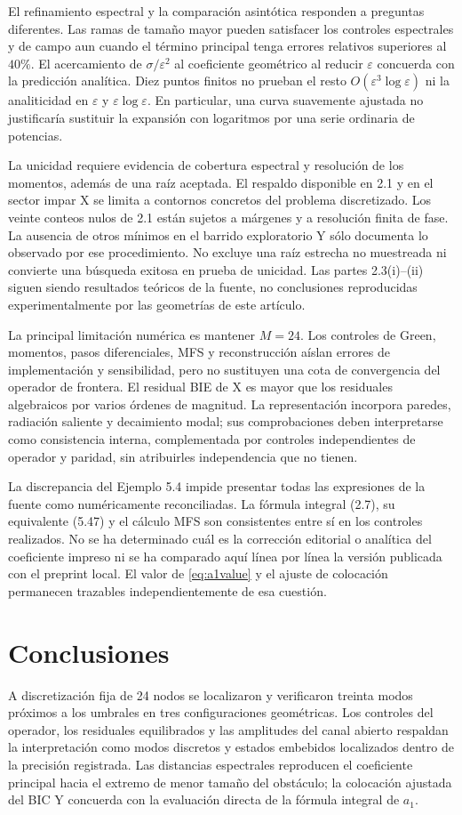 \documentclass[11pt]{article}
\newcommand{\eps}{\varepsilon}
\begin{document}
El refinamiento espectral y la comparación asintótica responden a preguntas diferentes. Las ramas de tamaño mayor pueden satisfacer los controles espectrales y de campo aun cuando el término principal tenga errores relativos superiores al $40\%$. El acercamiento de $\sigma/\eps^2$ al coeficiente geométrico al reducir $\eps$ concuerda con la predicción analítica. Diez puntos finitos no prueban el resto $O(\eps^3\log\eps)$ ni la analiticidad en $\eps$ y $\eps\log\eps$. En particular, una curva suavemente ajustada no justificaría sustituir la expansión con logaritmos por una serie ordinaria de potencias.

La unicidad requiere evidencia de cobertura espectral y resolución de los momentos, además de una raíz aceptada. El respaldo disponible en 2.1 y en el sector impar X se limita a contornos concretos del problema discretizado. Los veinte conteos nulos de 2.1 están sujetos a márgenes y a resolución finita de fase. La ausencia de otros mínimos en el barrido exploratorio Y sólo documenta lo observado por ese procedimiento. No excluye una raíz estrecha no muestreada ni convierte una búsqueda exitosa en prueba de unicidad. Las partes 2.3(i)--(ii) siguen siendo resultados teóricos de la fuente, no conclusiones reproducidas experimentalmente por las geometrías de este artículo.

La principal limitación numérica es mantener $M=24$. Los controles de Green, momentos, pasos diferenciales, MFS y reconstrucción aíslan errores de implementación y sensibilidad, pero no sustituyen una cota de convergencia del operador de frontera. El residual BIE de X es mayor que los residuales algebraicos por varios órdenes de magnitud. La representación incorpora paredes, radiación saliente y decaimiento modal; sus comprobaciones deben interpretarse como consistencia interna, complementada por controles independientes de operador y paridad, sin atribuirles independencia que no tienen.

La discrepancia del Ejemplo 5.4 impide presentar todas las expresiones de la fuente como numéricamente reconciliadas. La fórmula integral (2.7), su equivalente (5.47) y el cálculo MFS son consistentes entre sí en los controles realizados. No se ha determinado cuál es la corrección editorial o analítica del coeficiente impreso ni se ha comparado aquí línea por línea la versión publicada con el preprint local. El valor de \eqref{eq:a1value} y el ajuste de colocación permanecen trazables independientemente de esa cuestión.

\section{Conclusiones}
A discretización fija de 24 nodos se localizaron y verificaron treinta modos próximos a los umbrales en tres configuraciones geométricas. Los controles del operador, los residuales equilibrados y las amplitudes del canal abierto respaldan la interpretación como modos discretos y estados embebidos localizados dentro de la precisión registrada. Las distancias espectrales reproducen el coeficiente principal hacia el extremo de menor tamaño del obstáculo; la colocación ajustada del BIC Y concuerda con la evaluación directa de la fórmula integral de $a_1$.
\end{document}
